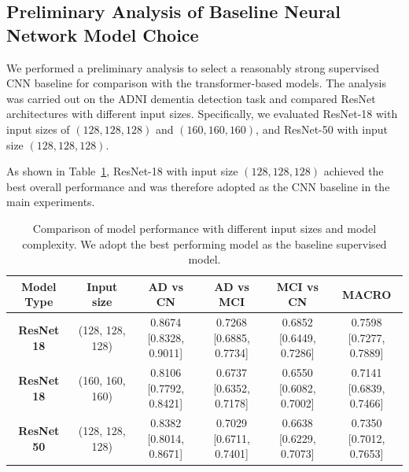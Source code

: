 \documentclass[pdflatex,sn-nature]{sn-jnl}%
\theoremstyle{thmstyleone}%
\theoremstyle{thmstyletwo}%
\theoremstyle{thmstylethree}%
\begin{document}
\begin{appendices}
\subsection{Preliminary Analysis of Baseline Neural Network Model Choice}
\label{sec:preliminary_analysis}

We performed a preliminary analysis to select a reasonably strong supervised CNN baseline for comparison with the transformer-based models. The analysis was carried out on the ADNI dementia detection task and compared ResNet architectures with different input sizes. Specifically, we evaluated ResNet-18 with input sizes of $(128,128,128)$ and $(160,160,160)$, and ResNet-50 with input size $(128,128,128)$.

As shown in Table~\ref{tab:baseline_model_choice}, ResNet-18 with input size $(128,128,128)$ achieved the best overall performance and was therefore adopted as the CNN baseline in the main experiments.

\begin{table}[h]
\centering
\begin{tabular}{c|c|c|c|c|c}
\hline
\textbf{Model Type} & \textbf{Input size} & \textbf{AD vs CN} & \textbf{AD vs MCI} & \textbf{MCI vs CN} & \textbf{MACRO} \\
\hline
\textbf{ResNet 18} & (128, 128, 128) &
\makecell{0.8674\\{[0.8328, 0.9011]}} &
\makecell{0.7268\\{[0.6885, 0.7734]}} &
\makecell{0.6852\\{[0.6449, 0.7286]}} &
\makecell{0.7598\\{[0.7277, 0.7889]}} \\
\textbf{ResNet 18} & (160, 160, 160) &
\makecell{0.8106\\{[0.7792, 0.8421]}} &
\makecell{0.6737\\{[0.6352, 0.7178]}} &
\makecell{0.6550\\{[0.6082, 0.7002]}} &
\makecell{0.7141\\{[0.6839, 0.7466]}}\\
\textbf{ResNet 50} & (128, 128, 128) &
\makecell{0.8382\\{[0.8014, 0.8671]}} &
\makecell{0.7029\\{[0.6711, 0.7401]}} &
\makecell{0.6638\\{[0.6229, 0.7073]}} &
\makecell{0.7350\\{[0.7012, 0.7653]}} \\
\hline
\end{tabular}
\caption{Comparison of model performance with different input sizes and model complexity. We adopt the best performing model as the baseline supervised model.}
\label{tab:baseline_model_choice}
\end{table}


\end{appendices}
\end{document}
